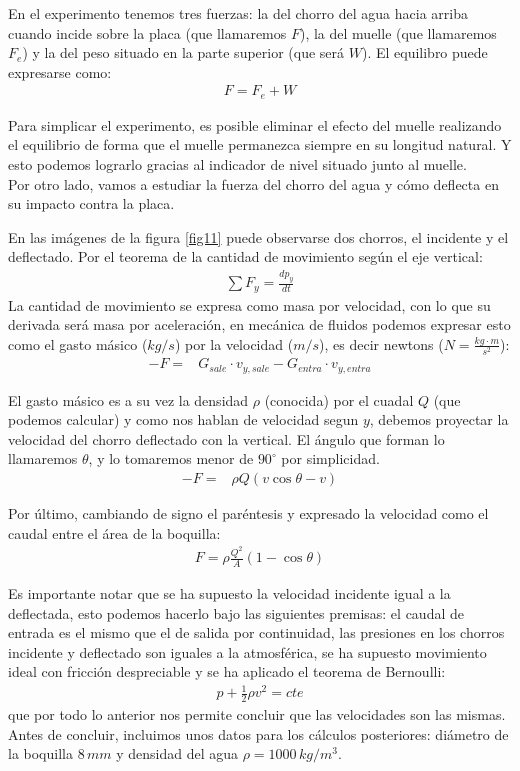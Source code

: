 \documentclass[12pt,a4paper]{article}
\newcommand{\grad}{^{\circ}}
\begin{document}
En el experimento tenemos tres fuerzas: la del chorro del agua hacia arriba cuando incide sobre la placa (que llamaremos $F$), la del muelle (que llamaremos $F_{e}$) y la del peso situado en la parte superior (que será $W$). El equilibro puede expresarse como:
\begin{align*}
F=F_{e}+W
\end{align*}

Para simplicar el experimento, es posible eliminar el efecto del muelle realizando el equilibrio de forma que el muelle permanezca siempre en su longitud natural. Y esto podemos lograrlo gracias al indicador de nivel situado junto al muelle.\\

Por otro lado, vamos a estudiar la fuerza del chorro del agua y cómo deflecta en su impacto contra la placa.

En las imágenes de la figura \ref{fig11} puede observarse dos chorros, el incidente y el deflectado. Por el teorema de la cantidad de movimiento según el eje vertical:
\begin{align*}
\sum F_{y}= \frac{dp_y}{dt}
\end{align*}
La cantidad de movimiento se expresa como masa por velocidad, con lo que su derivada será masa por aceleración, en mecánica de fluidos podemos expresar esto como el gasto másico ($kg/s$) por la velocidad ($m/s$), es decir newtons ($N=\frac{kg{\cdot}m}{s^2}$):
\begin{align*}
- F =& G_{sale} \cdot v_{y,sale} - G_{entra}\cdot v_{y,entra}
\end{align*}

El gasto másico es a su vez la densidad $\rho$ (conocida) por el cuadal $Q$ (que podemos calcular) y como nos hablan de velocidad segun $y$, debemos proyectar la velocidad del chorro deflectado con la vertical. El ángulo que forman lo llamaremos $\theta$, y lo tomaremos menor de $90\grad$ por simplicidad.
\begin{align*}
- F =& \rho Q(v \cos\theta - v)
\end{align*}

Por último, cambiando de signo el paréntesis y expresado la velocidad como el caudal entre el área de la boquilla:
\begin{align*}
\boxed{F = \rho \frac{Q^{2}}{A}(1-\cos\theta)}
\end{align*}

Es importante notar que se ha supuesto la velocidad incidente igual a la deflectada, esto podemos hacerlo bajo las siguientes premisas: el caudal de entrada es el mismo que el de salida por continuidad, las presiones en los chorros incidente y deflectado son iguales a la atmosférica, se ha supuesto movimiento ideal con fricción despreciable y se ha aplicado el teorema de Bernoulli:
\begin{align*}
p+\frac{1}{2}\rho v^2= cte
\end{align*}
que por todo lo anterior nos permite concluir que las velocidades son las mismas.
Antes de concluir, incluimos unos datos para los cálculos posteriores: diámetro de la boquilla $8\,mm$ y densidad del agua $\rho=1000\,kg/m^3$.\\
\end{document}
